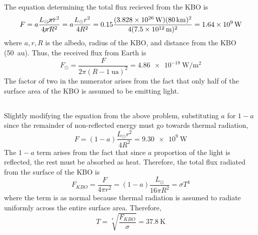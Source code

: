 \documentclass{article}
\begin{document}
\subsection{}

The equation determining the total flux recieved from the KBO is
\begin{equation}
    F = a \frac{L_\odot \cancel{\pi} r^2}{4 \cancel{\pi} R^2} = a \frac{L_\odot r^2}{4 R^2} = 0.15 \frac{(\SI{3.828e+26}{\watt}) (\SI{80}{\kilo\meter})^2}{4 (\SI{7.5e+12}{\meter})^2} = \SI{1.64e+9}{\watt}
\end{equation}
where \(a, r, R\) is the albedo, radius of the KBO, and distance from the KBO (\SI{50}{\astronomicalunit}).
Thus, the received flux from Earth is
\begin{equation} \label{eq:3a}
    F_\odot = \frac{F}{2 \pi (R - \SI{1}{\astronomicalunit})^2} = \SI{4.86e-18}{\watt\per\meter\squared}
\end{equation}
The factor of two in the numerator arises from the fact that only half of the surface area of the KBO is assumed to be emitting light.

\subsection{}

Slightly modifying the equation from the above problem, substituting \(a\) for \(1 - a\) since the remainder of non-reflected energy must go towards thermal radiation,
\begin{equation}
    F = (1 - a) \frac{L_\odot r^2}{4 R^2} = \SI{9.30e+9}{\watt}
\end{equation}
The \(1 - a\) term arises from the fact that since \(a\) proportion of the light is reflected, the rest must be absorbed as heat.
Therefore, the total flux radiated from the surface of the KBO is
\begin{equation}
    F_{KBO} = \frac{F}{4 \pi r^2} = (1 - a) \frac{L_\odot}{16 \pi R^2} = \sigma T^4
\end{equation}
where the term is as normal because thermal radiation is assumed to radiate uniformly across the entire surface area.
Therefore,
\begin{equation}
    T = \sqrt[4]{\frac{F_{KBO}}{\sigma}} = \SI{37.8}{\kelvin}
\end{equation}

\subsection{}
\end{document}
